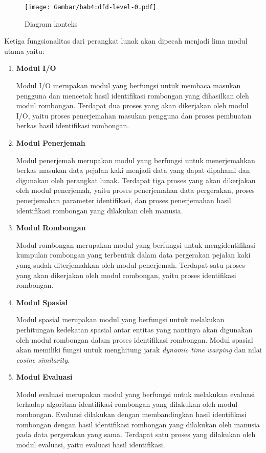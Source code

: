 \begin{figure}[h]
    \centering
    \texttt{[image: Gambar/bab4:dfd-level-0.pdf]}
    \caption{Diagram konteks}
    \label{bab4:context-diagram}
\end{figure}

\noindent Ketiga fungsionalitas dari perangkat lunak akan dipecah menjadi lima modul utama yaitu:

\begin{enumerate}
    \item \textbf{Modul I/O}
    
    Modul I/O merupakan modul yang berfungsi untuk membaca masukan pengguna dan mencetak hasil identifikasi rombongan yang dihasilkan oleh modul rombongan. Terdapat dua proses yang akan dikerjakan oleh modul I/O, yaitu proses penerjemahan masukan pengguna dan proses pembuatan berkas hasil identifikasi rombongan.
    
    \clearpage
    
    \item \textbf{Modul Penerjemah}
    
    Modul penerjemah merupakan modul yang berfungsi untuk menerjemahkan berkas masukan data pejalan kaki menjadi data yang dapat dipahami dan digunakan oleh perangkat lunak. Terdapat tiga proses yang akan dikerjakan oleh modul penerjemah, yaitu proses penerjemahan data pergerakan, proses penerjemahan parameter identifikasi, dan proses penerjemahan hasil identifikasi rombongan yang dilakukan oleh manusia.
    
    \item \textbf{Modul Rombongan}
    
    Modul rombongan merupakan modul yang berfungsi untuk mengidentifikasi kumpulan rombongan yang terbentuk dalam data pergerakan pejalan kaki yang sudah diterjemahkan oleh modul penerjemah. Terdapat satu proses yang akan dikerjakan oleh modul rombongan, yaitu proses identifikasi rombongan.

    \item \textbf{Modul Spasial}
    
    Modul spasial merupakan modul yang berfungsi untuk melakukan perhitungan kedekatan spasial antar entitas yang nantinya akan digunakan oleh modul rombongan dalam proses identifikasi rombongan. Modul spasial akan memiliki fungsi untuk menghitung jarak \textit{dynamic time warping} dan nilai \textit{cosine similarity}.
    
    \item \textbf{Modul Evaluasi}
    
    Modul evaluasi merupakan modul yang berfungsi untuk melakukan evaluasi terhadap algoritma identifikasi rombongan yang dilakukan oleh modul rombongan. Evaluasi dilakukan dengan membandingkan hasil identifikasi rombongan dengan hasil identifikasi rombongan yang dilakukan oleh manusia pada data pergerakan yang sama. Terdapat satu proses yang dilakukan oleh modul evaluasi, yaitu evaluasi hasil identifikasi.
\end{enumerate}

